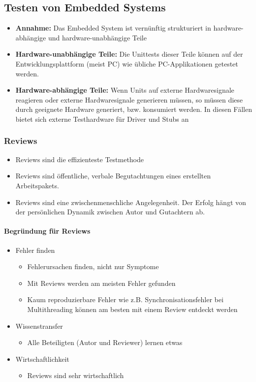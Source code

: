 \subsection{Testen von Embedded Systems}
\begin{itemize}
    \item \textbf{Annahme:} Das Embedded System ist vernünftig strukturiert in hardware-abhängige und hardware-unabhängige Teile
    \item \textbf{Hardware-unabhängige Teile:} Die Unittests dieser Teile können auf der Entwicklungsplattform (meist PC) wie übliche PC-Applikationen getestet werden.
    \item \textbf{Hardware-abhängige Teile:} Wenn Units auf externe Hardwaresignale reagieren oder externe Hardwaresignale generieren müssen, so müssen diese durch geeignete Hardware generiert, bzw. konsumiert werden. In diesen Fällen bietet sich externe Testhardware für Driver und Stubs an
\end{itemize}

\subsubsection{Reviews}
\begin{itemize}
    \item Reviews sind die effizienteste Testmethode
    \item Reviews sind öffentliche, verbale Begutachtungen eines erstellten Arbeitspakets.
    \item Reviews sind eine zwischenmenschliche Angelegenheit. Der Erfolg hängt von der persönlichen Dynamik zwischen Autor und Gutachtern ab.
\end{itemize}

\paragraph{Begründung für Reviews}
\begin{itemize}
    \item Fehler finden
        \begin{itemize}
            \item Fehlerursachen finden, nicht nur Symptome
            \item Mit Reviews werden am meisten Fehler gefunden
            \item Kaum reproduzierbare Fehler wie z.B. Synchronisationsfehler bei Multithreading können am besten mit einem Review entdeckt werden
        \end{itemize}
    \item Wissenstransfer
        \begin{itemize}
            \item Alle Beteiligten (Autor und Reviewer) lernen etwas
        \end{itemize}
    \item Wirtschaftlichkeit
        \begin{itemize}
            \item Reviews sind sehr wirtschaftlich
        \end{itemize}
\end{itemize}

